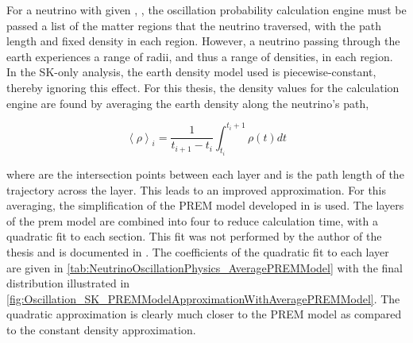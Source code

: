 
For a neutrino with given , , the oscillation probability calculation engine must be passed a list of the matter regions that the neutrino traversed, with the path length and fixed density in each region. However, a neutrino passing through the earth experiences a range of radii, and thus a range of densities, in each region. In the SK-only analysis, the earth density model used is piecewise-constant, thereby ignoring this effect. For this thesis, the density values for the calculation engine are found by averaging the earth density along the neutrino's path,

\begin{equation}
  \left< \rho \right>_{i} = \frac{1}{t_{i+1}-t_{i}} \int^{t_{i}+1}_{t_{i}} \rho(t) dt
\end{equation}

where  are the intersection points between each layer and  is the path length of the trajectory across the layer. This leads to an improved approximation. For this averaging, the simplification of the PREM model developed in \cite{EarthGrav} is used. The layers of the prem model are combined into four to reduce calculation time, with a quadratic fit to each section. This fit was not performed by the author of the thesis and is documented in \cite{t2k_tn_425}. The coefficients of the quadratic fit to each layer are given in \autoref{tab:NeutrinoOscillationPhysics_AveragePREMModel} with the final distribution illustrated in \autoref{fig:Oscillation_SK_PREMModelApproximationWithAveragePREMModel}. The quadratic approximation is clearly much closer to the PREM model as compared to the constant density approximation. 




